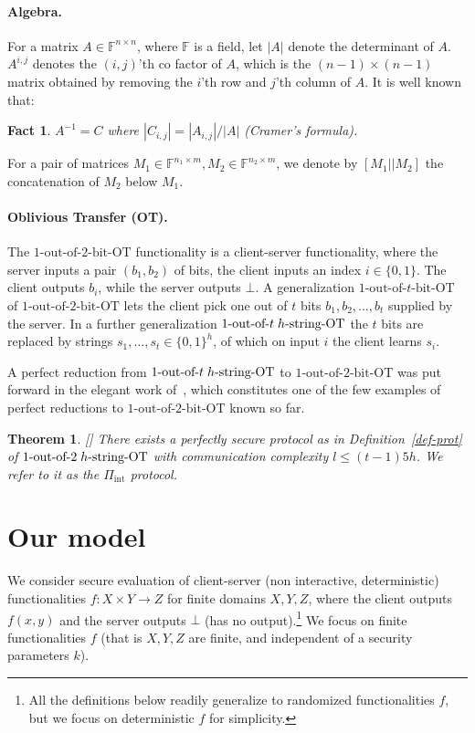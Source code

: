 \documentclass[a4paper]{article}
\newtheorem{theorem}{Theorem}[section]
\newtheorem{fact}{Fact}
\newcommand{\OT}[2]{#1\text{-out-of-}#2\text{-bit-OT}}
\newcommand{\sOT}[3]{#1\text{-out-of-}#2\text{\;$#3$-string-OT}}
\newcommand{\F}{\mathbb{F}}
\newcommand{\INT}{\Pi_{\text{int}}}
\begin{document}
\paragraph{Algebra.}

For a matrix $A\in \F^{n\times n}$, where $\F$ is a field, let
$|A|$ denote the determinant of $A$. $A^{i,j}$ denotes the $(i,j)$'th co factor of $A$, which is the $(n-1)\times(n-1)$ matrix obtained by removing the $i$'th row and $j$'th column of $A$.
It is well known that:
\begin{fact}\label{fact-cramer}
	$A^{-1}=C$ where $|C_{i,j}|=|A_{i,j}|/|A|$
	(Cramer's formula).
\end{fact}
For a pair of matrices $M_1\in \F^{n_1\times m},M_2\in \F^{n_2\times m}$, we denote by $[M_1||M_2]$ the concatenation of $M_2$ below $M_1$.

\paragraph{Oblivious Transfer (OT).}


The $\OT{1}{2}$ functionality is a client-server functionality, where the server inputs a pair $(b_1,b_2)$ of bits, the client inputs an index $i\in\{0,1\}$. The client outputs $b_i$, while the server outputs $\bot$.
A generalization $\OT{1}{t}$ of $\OT{1}{2}$ lets the client pick one out of $t$ bits $b_1,b_2,\ldots,b_t$ supplied by the server.
In a further generalization $\sOT{1}{t}{h}$ the $t$ bits are replaced by strings $s_1,\ldots,s_t\in \{0,1\}^h$, of which on input $i$ the client learns $s_i$.


A perfect reduction from $\sOT{1}{t}{h}$ to $\OT{1}{2}$ was put forward in the elegant work of~\cite{BCS96}, which constitutes one of the few examples of perfect reductions to $\OT{1}{2}$ known so far.

\begin{theorem}\label{thm-int}[\cite{BCS96}]
	There exists a perfectly secure protocol as in Definition~\ref{def-prot} of $\sOT{1}{2}{h}$ with communication complexity $l\leq (t-1)5h$. We refer to it as the $\INT$ protocol. 	
\end{theorem}

\section{Our model}
We consider secure evaluation of client-server (non interactive, deterministic) functionalities $f:X\times Y\rightarrow Z$ for finite domains $X,Y,Z$, where the client outputs $f(x,y)$ and the server outputs $\bot$ (has no output).\footnote{All the definitions below readily generalize to randomized functionalities $f$, but we focus on deterministic $f$ for simplicity.} 
We focus on finite functionalities $f$ (that is $X,Y,Z$ are finite, and independent of a security parameters $k$).
\end{document}
